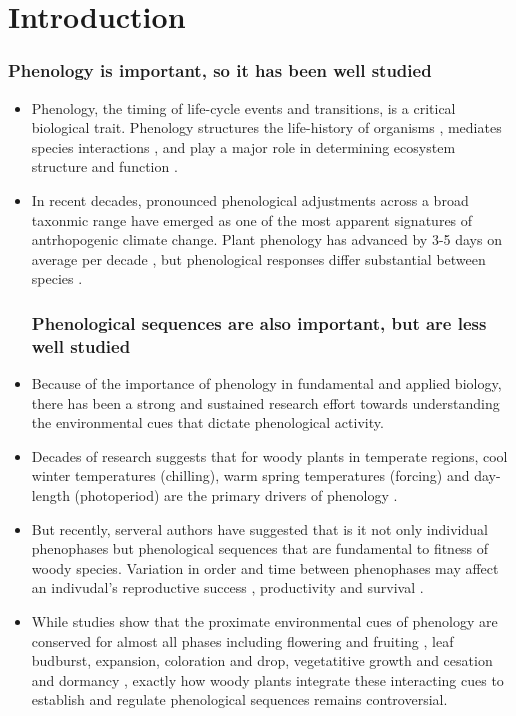 \documentclass{article}\usepackage[]{graphicx}\usepackage[]{color}
\begin{document}
\section*{Introduction}
\subsubsection*{Phenology is important, so it has been well studied}
\begin{itemize}
\item Phenology, the timing of life-cycle events and transitions, is a critical biological trait. Phenology structures the life-history of organisms \citep{}, mediates species interactions \citep{}, and play a major role in determining ecosystem structure and function \citep{}.
\item In recent decades, pronounced phenological adjustments across a broad taxonmic range have emerged as one of the most apparent signatures of antrhopogenic climate change. Plant phenology has advanced by 3-5 days on average per decade \citep{Menzel2006, Parmesan2003, Root2003}, but phenological responses differ substantial between species \citep{Cleland2012,Ovaskainen2013}.

\subsubsection*{Phenological sequences are also important, but are less well studied}
\item Because of the importance of phenology in fundamental and applied biology, there has been a strong and sustained research effort towards understanding the environmental cues that dictate phenological activity.
\item Decades of research suggests that for woody plants in temperate regions, cool winter temperatures (chilling), warm spring temperatures (forcing) and day-length (photoperiod) are the primary drivers of phenology \citep{}. 
\item But recently, serveral authors have suggested that is it not only individual phenophases but phenological sequences that are fundamental to fitness of woody species. Variation in order and time between phenophases may affect an indivudal's reproductive success \citep{}, productivity \citep{} and survival \citep{}. 
\item While studies show that the proximate environmental cues of phenology are conserved for almost all phases including flowering and fruiting \citep{}, leaf budburst, expansion, coloration and drop\citep{}, vegetatitive growth and cesation\citep{} and dormancy \citep{}, exactly how woody plants integrate these interacting cues to establish and regulate phenological sequences remains controversial. %
\end{itemize}
\end{document}
